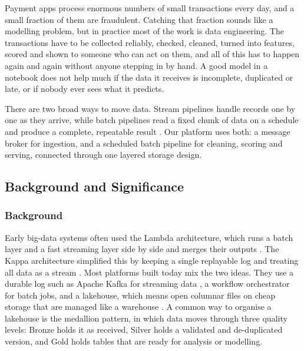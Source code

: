 \documentclass[11pt,a4paper]{article}
\begin{document}
Payment apps process enormous numbers of small transactions every day, and a
small fraction of them are fraudulent. Catching that fraction sounds like a
modelling problem, but in practice most of the work is data engineering. The
transactions have to be collected reliably, checked, cleaned, turned into
features, scored and shown to someone who can act on them, and all of this has
to happen again and again without anyone stepping in by hand. A good model in a
notebook does not help much if the data it receives is incomplete, duplicated or
late, or if nobody ever sees what it predicts.

There are two broad ways to move data. Stream pipelines handle records one by
one as they arrive, while batch pipelines read a fixed chunk of data on a
schedule and produce a complete, repeatable result \citep{akidau2015dataflow}.
Our platform uses both: a message broker for ingestion, and a scheduled batch
pipeline for cleaning, scoring and serving, connected through one layered
storage design.

\subsection{Background and Significance}

\subsubsection{Background}
Early big-data systems often used the Lambda architecture, which runs a batch
layer and a fast streaming layer side by side and merges their outputs
\citep{marz2015bigdata}. The Kappa architecture simplified this by keeping a
single replayable log and treating all data as a stream \citep{kreps2014lambda}.
Most platforms built today mix the two ideas. They use a durable log such as
Apache Kafka for streaming data \citep{kreps2011kafka}, a workflow orchestrator
for batch jobs, and a lakehouse, which means open columnar files on cheap storage
that are managed like a warehouse \citep{armbrust2021lakehouse}. A common way to
organise a lakehouse is the medallion pattern, in which data moves through three
quality levels: Bronze holds it as received, Silver holds a validated and
de-duplicated version, and Gold holds tables that are ready for analysis or
modelling.
\end{document}
